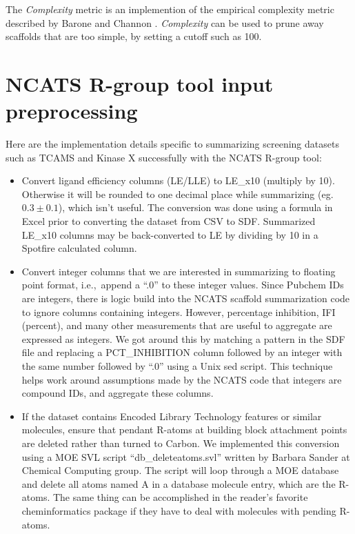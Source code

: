 \documentclass[11pt,letterpaper]{article}
\newcommand*\ie{i.e.,~}
\begin{document}
The \textit{Complexity} metric is an implemention of the empirical
complexity metric described by Barone and Channon \cite{Barone2001}.
\textit{Complexity} can be used to prune away scaffolds that are too
simple, by setting a cutoff such as 100.

\newpage 

\section{NCATS R-group tool input preprocessing}
\label{sec:ncats-prepro}
Here are the implementation details specific to summarizing screening datasets such as TCAMS and Kinase X successfully with the NCATS R-group tool:
\begin{itemize}

\item Convert ligand efficiency columns (LE/LLE) to LE\_x10 (multiply by 10). Otherwise it will be rounded to one decimal place while summarizing (eg. $0.3 \pm  0.1$), which isn't useful. The conversion was done using a formula in Excel prior to converting the dataset from CSV to SDF. Summarized LE\_x10 columns may be back-converted to LE by dividing by 10 in a Spotfire calculated column.  

\item Convert integer columns that we are interested in summarizing to floating point format, \ie append a ``.0'' to these integer values. Since Pubchem IDs are integers, there is logic build into the NCATS scaffold summarization code to ignore columns containing integers. However, percentage inhibition, IFI (percent), and many other measurements that are useful to aggregate are expressed as integers.  We got around this by matching a pattern in the SDF file and replacing a PCT\_INHIBITION column followed by an integer with the same number followed by ``.0'' using a Unix sed script. This technique helps work around assumptions made by the NCATS code that integers are compound IDs, and aggregate these columns.
  
\item If the dataset contains Encoded Library Technology features or similar molecules, ensure that pendant  R-atoms  at building block attachment points are deleted rather than turned to Carbon. We implemented this conversion using a MOE SVL script ``db\_deleteatoms.svl'' written by Barbara Sander at Chemical Computing group. The script will loop through a MOE database and delete all atoms named  A  in a database molecule entry, which are the R-atoms. The same thing can be accomplished in the reader's favorite cheminformatics package if they have to deal with molecules with pending R-atoms.  
\end{itemize}
\end{document}
